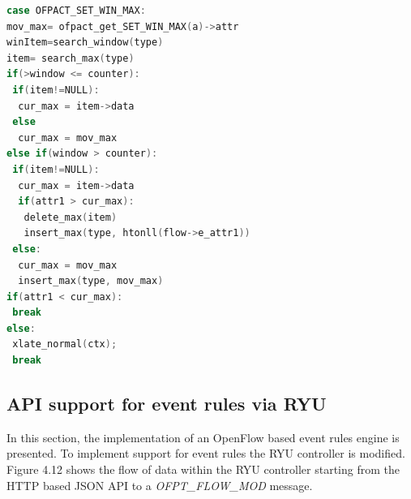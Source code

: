 \begin{itemize}
\begin{lstlisting}[language=c]
case OFPACT_SET_WIN_MAX:
mov_max= ofpact_get_SET_WIN_MAX(a)->attr 
winItem=search_window(type)
item= search_max(type)
if(>window <= counter):
 if(item!=NULL):
  cur_max = item->data 
 else
  cur_max = mov_max
else if(window > counter):
 if(item!=NULL):                     
  cur_max = item->data
  if(attr1 > cur_max):
   delete_max(item)
   insert_max(type, htonll(flow->e_attr1))                     
 else:
  cur_max = mov_max
  insert_max(type, mov_max)
if(attr1 < cur_max): 
 break
else:
 xlate_normal(ctx);   
 break
\end{lstlisting} 
\end{itemize}

\subsection{API support for event rules via RYU}
In this section, the implementation of an OpenFlow based event rules engine is presented. To implement support for event rules the RYU controller is modified. Figure 4.12 shows the flow of data within the RYU controller starting from the HTTP based JSON API to a \textit{OFPT_FLOW_MOD} message. 

